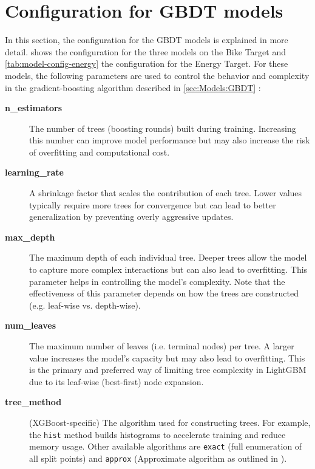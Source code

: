 \section{Configuration for GBDT models}
\label{appendix:GBDT-configs}

In this section, the configuration for the GBDT models is explained in more detail.  shows the configuration for the three models on the Bike Target and \cref{tab:model-config-energy} the configuration for the Energy Target. For these models, the following parameters are used to control the behavior and complexity in the gradient-boosting algorithm described in \cref{sec:Models:GBDT} \parencite[1941--1943]{bentejac_comparative_2021}: 

\begin{description}
  \item[\textbf{n\_estimators}] The number of trees (boosting rounds) built during training. Increasing this number can improve model performance but may also increase the risk of overfitting and computational cost.
  
  \item[\textbf{learning\_rate}] A shrinkage factor that scales the contribution of each tree. Lower values typically require more trees for convergence but can lead to better generalization by preventing overly aggressive updates.
  
  \item[\textbf{max\_depth}] The maximum depth of each individual tree. Deeper trees allow the model to capture more complex interactions but can also lead to overfitting. This parameter helps in controlling the model’s complexity. Note that the effectiveness of this parameter depends on how the trees are constructed (e.g. leaf-wise vs. depth-wise).

  \item[\textbf{num\_leaves}] The maximum number of leaves (i.e. terminal nodes) per tree. A larger value increases the model’s capacity but may also lead to overfitting. This is the primary and preferred way of limiting tree complexity in LightGBM due to its leaf-wise (best-first) node expansion.
  
  \item[\textbf{tree\_method}] (XGBoost-specific) The algorithm used for constructing trees. For example, the \texttt{hist} method builds histograms to accelerate training and reduce memory usage. Other available algorithms are \texttt{exact} (full enumeration of all split points) and \texttt{approx} (Approximate algorithm as outlined in \cite[Chapter~3.2]{chen_xgboost_2016}).
  

\end{description}
